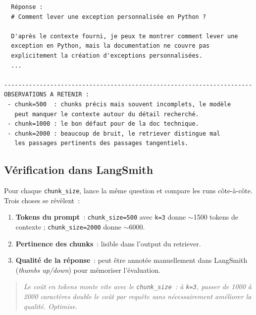 \documentclass[11pt,a4paper]{article}
\begin{document}
\begin{tcolorbox}[
  colback=white,
  colframe=black!50,
  coltitle=black,
  fonttitle=\footnotesize\bfseries,
  fontupper=\footnotesize,
  title=Sortie de l'exécution,
  breakable,
]
\begin{verbatim}
  Réponse :
  # Comment lever une exception personnalisée en Python ?

  D'après le contexte fourni, je peux te montrer comment lever une
  exception en Python, mais la documentation ne couvre pas
  explicitement la création d'exceptions personnalisées.
  ...

----------------------------------------------------------------------
OBSERVATIONS A RETENIR :
 - chunk=500  : chunks précis mais souvent incomplets, le modèle
   peut manquer le contexte autour du détail recherché.
 - chunk=1000 : le bon défaut pour de la doc technique.
 - chunk=2000 : beaucoup de bruit, le retriever distingue mal
   les passages pertinents des passages tangentiels.
\end{verbatim}
\end{tcolorbox}

\subsection{Vérification dans LangSmith}

Pour chaque \texttt{chunk\_size}, lance la même question et compare les
runs côte-à-côte. Trois choses se révèlent~:

\begin{enumerate}[leftmargin=*]
  \item \textbf{Tokens du prompt}~: \texttt{chunk\_size=500} avec
        \texttt{k=3} donne $\sim$1500 tokens de contexte ;
        \texttt{chunk\_size=2000} donne $\sim$6000.
  \item \textbf{Pertinence des chunks}~: lisible dans l'output du
        retriever.
  \item \textbf{Qualité de la réponse}~: peut être annotée manuellement
        dans LangSmith (\emph{thumbs up/down}) pour mémoriser l'évaluation.
\end{enumerate}

\begin{quote}\itshape
Le coût en tokens monte vite avec le \texttt{chunk\_size}~: à
\texttt{k=3}, passer de 1000 à 2000 caractères double le coût par
requête sans nécessairement améliorer la qualité. Optimise.
\end{quote}
\end{document}
